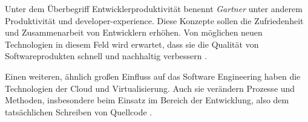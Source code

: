 Unter dem Überbegriff Entwicklerproduktivität benennt \textit{Gartner} unter anderem Produktivität und \Gls{developer-experience}. Diese Konzepte sollen die Zufriedenheit und Zusammenarbeit von Entwicklern erhöhen. Von möglichen neuen Technologien in diesem Feld wird erwartet, dass sie die Qualität von Softwareprodukten schnell und nachhaltig verbessern \cite{107:Spotlight-on-2024-Gartner-Hype-Cycle-for-Emerging-Technologies}.

Einen weiteren, ähnlich großen Einfluss auf das Software Engineering haben die Technologien der Cloud und Virtualisierung. Auch sie verändern Prozesse und Methoden, insbesondere beim Einsatz im Bereich der Entwicklung, also dem tatsächlichen Schreiben von Quellcode \cite{014:Managing-Container-based-Software-Development-Environments}.
